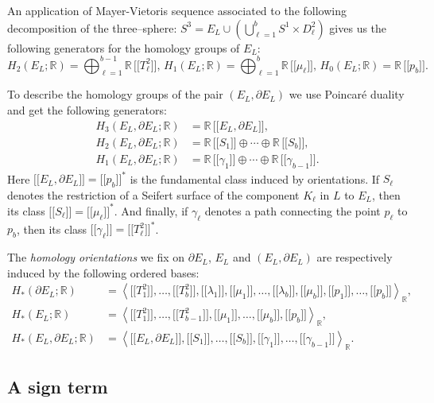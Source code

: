 \documentclass[a4paper]{amsart}
\theoremstyle{plain}
\theoremstyle{definition}
\theoremstyle{remark}
\newcommand{\IR}{{\mathbb R}}
\newcommand{\bbrack}[1]{\lbrack \! \lbrack #1 \rbrack \! \rbrack}
\newcommand{\bord}{\partial}
\begin{document}
An application of Mayer-Vietoris sequence associated to the following decomposition of the three--sphere:
$S^3 = E_L \cup (\bigcup_{\ell = 1}^b S^1 \times D^2_\ell)$ gives us the following
generators for the homology groups of $E_L$:
$$
H_2(E_L;\IR) = \bigoplus_{\ell=1}^{b-1} \IR \, \bbrack{T^2_\ell},\,
H_1(E_L;\IR) = \bigoplus_{\ell=1}^b \IR \, \bbrack{\mu_\ell},\,
H_0(E_L;\IR) = \IR \, \bbrack{p_b}.
$$

To describe the homology groups of the pair $(E_L, \bord E_L)$ we use
Poincar\'e duality and get the following generators:
\begin{align*}
H_3(E_L, \bord E_L;\IR) &= \IR \, \bbrack{E_L, \bord E_L},\\
H_2(E_L, \bord E_L;\IR) &= \IR \, \bbrack{S_1} \oplus \cdots \oplus \IR \, \bbrack{S_b},\\
H_1(E_L, \bord E_L;\IR) &= \IR \, \bbrack{\gamma_1} \oplus \cdots \oplus \IR \, \bbrack{\gamma_{b-1}}.
\end{align*}
Here $\bbrack{E_L, \bord E_L} = \bbrack{p_b}^*$ is the fundamental class induced by
orientations. If $S_\ell$ denotes the restriction of a Seifert surface of
the component $K_\ell$ in $L$ to $E_L$, then its class $\bbrack{S_\ell} = \bbrack{\mu_\ell}^*$. 
And finally, if $\gamma_\ell$ denotes a path connecting the
point $p_\ell$ to $p_b$, then its class $\bbrack{\gamma_\ell} = \bbrack{T_\ell^2}^*$.

The \emph{homology orientations} we fix on $\bord E_L$, $E_L$ and 
$(E_L, \bord E_L)$ are respectively induced by the following ordered bases:
\begin{align}\label{eqn:bases_the_pair}
  H_*(\bord E_L;\IR)
  &= \left\langle { 
       \bbrack{T^2_1}, \ldots, \bbrack{T^2_b}, 
       \bbrack{\lambda_1}, \bbrack{\mu_1}, 
       \ldots, 
       \bbrack{\lambda_b}, \bbrack{\mu_b}, 
       \bbrack{p_1}, \ldots, \bbrack{p_b} 
     } \right\rangle_\IR, \nonumber \\
  H_*(E_L;\IR)
  &= \left\langle { 
       \bbrack{T^2_1}, \ldots, \bbrack{T^2_{b-1}}, 
       \bbrack{\mu_1}, \ldots, \bbrack{\mu_b}, 
       \bbrack{p_b}
     } \right\rangle_\IR, \\
  H_*(E_L, \bord E_L;\IR) 
  &= \left\langle { 
       \bbrack{E_L, \bord E_L}, 
       \bbrack{S_1}, \ldots, \bbrack{S_b}, 
       \bbrack{\gamma_1}, \ldots, \bbrack{\gamma_{b-1}}
     }\right\rangle_\IR. \nonumber
\end{align}

\subsection{A sign term}
\end{document}
